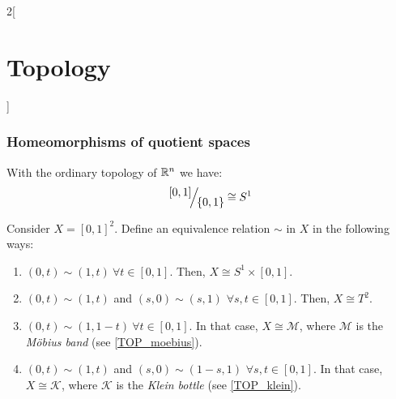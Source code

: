 \documentclass[../../../main.tex]{subfiles}
\begin{document}
\begin{multicols}{2}[\section{Topology}]
    \subsubsection{Homeomorphisms of quotient spaces}
    \begin{prop}
        With the ordinary topology of $\mathbb{R}^n$ we have: $$\quot{[0,1]}{\{0,1\}}\cong S^1$$
    \end{prop}
    \begin{prop}\label{TOP_square-sim}
        Consider $X=[0,1]^2$. Define an equivalence relation $\sim$ in $X$ in the following ways:
        \begin{enumerate}
            \item $(0,t)\sim(1,t)\ \forall t\in[0,1]$. Then, $X\cong S^1\times [0,1]$.
            \item $(0,t)\sim(1,t)$ and $(s,0)\sim(s,1)$ $\forall s,t\in[0,1]$. Then, $X\cong T^2$.
            \item $(0,t)\sim(1,1-t)\ \forall t\in[0,1]$. In that case, $X\cong \mathcal{M}$, where $\mathcal{M}$ is the \emph{Möbius band} (see \cref{TOP_moebius}).
            \item $(0,t)\sim(1,t)$ and $(s,0)\sim(1-s,1)$ $\forall s,t\in[0,1]$. In that case, $X\cong \mathcal{K}$, where $\mathcal{K}$ is the \emph{Klein bottle} (see \cref{TOP_klein}).
        \end{enumerate}
        \begin{center}
            \begin{minipage}{\linewidth}
                \centering
                
            \end{minipage}
        \end{center}
    \end{prop}
    \begin{center}
        \begin{minipage}{\linewidth}
            \centering
            
            \label{TOP_moebius}
        \end{minipage}
    \end{center}
    \begin{center}
        \begin{minipage}{\linewidth}

\end{minipage}
\end{center}
\end{multicols}
\end{document}
